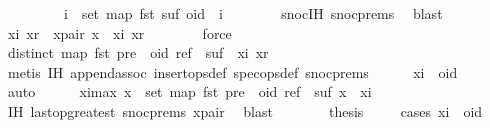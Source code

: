 \begin{isabellebody}
\ \ \ \ \ \ \ \ \ {\isacharparenleft}{\isasymforall}i\ {\isasymin}\ set\ {\isacharparenleft}map\ fst\ suf{\isacharparenright}{\isachardot}\ oid\ {\isacharless}\ i{\isacharparenright}{\isachardoublequoteclose}\isanewline
\ \ \ \ \ \ \isamarkupfalse%
\ snoc{\isachardot}IH\ snoc{\isachardot}prems{\isacharparenleft}{}{\isacharparenright}\ \isamarkupfalse%
\ blast\isanewline
\ \ \ \ \isamarkupfalse%
\ xi\ xr\ \ x{\isacharunderscore}pair{\isacharcolon}\ {\isachardoublequoteopen}x\ {\isacharequal}\ {\isacharparenleft}xi{\isacharcomma}\ xr{\isacharparenright}{\isachardoublequoteclose}\isanewline
\ \ \ \ \ \ \isamarkupfalse%
\ force\isanewline
\ \ \ \ \isamarkupfalse%
\ {\isachardoublequoteopen}distinct\ {\isacharparenleft}map\ fst\ {\isacharparenleft}pre\ {\isacharat}\ {\isacharbrackleft}{\isacharparenleft}oid{\isacharcomma}\ ref{\isacharparenright}{\isacharbrackright}\ {\isacharat}\ suf\ {\isacharat}\ {\isacharbrackleft}{\isacharparenleft}xi{\isacharcomma}\ xr{\isacharparenright}{\isacharbrackright}{\isacharparenright}{\isacharparenright}{\isachardoublequoteclose}\isanewline
\ \ \ \ \ \ \isamarkupfalse%
\ {\isacharparenleft}metis\ IH\ append{\isachardot}assoc\ insert{\isacharunderscore}ops{\isacharunderscore}def\ spec{\isacharunderscore}ops{\isacharunderscore}def\ snoc{\isachardot}prems{\isacharparenleft}{}{\isacharparenright}{\isacharparenright}\isanewline
\ \ \ \ \isamarkupfalse%
\ {\isachardoublequoteopen}xi\ {\isasymnoteq}\ oid{\isachardoublequoteclose}\isanewline
\ \ \ \ \ \ \isamarkupfalse%
\ auto\isanewline
\ \ \ \ \isamarkupfalse%
\ xi{\isacharunderscore}max{\isacharcolon}\ {\isachardoublequoteopen}{\isasymforall}x\ {\isasymin}\ set\ {\isacharparenleft}map\ fst\ {\isacharparenleft}pre\ {\isacharat}\ {\isacharbrackleft}{\isacharparenleft}oid{\isacharcomma}\ ref{\isacharparenright}{\isacharbrackright}\ {\isacharat}\ suf{\isacharparenright}{\isacharparenright}{\isachardot}\ x\ {\isacharless}\ xi{\isachardoublequoteclose}\isanewline
\ \ \ \ \ \ \isamarkupfalse%
\ IH\ last{\isacharunderscore}op{\isacharunderscore}greatest\ snoc{\isachardot}prems{\isacharparenleft}{}{\isacharparenright}\ x{\isacharunderscore}pair\ \isamarkupfalse%
\ blast\isanewline
\ \ \ \ \isamarkupfalse%
\ \isamarkupfalse%
\ {\isacharquery}thesis\isanewline
\ \ \ \ \isamarkupfalse%
{\isacharparenleft}cases\ {\isachardoublequoteopen}xi\ {\isacharless}\ oid{\isachardoublequoteclose}{\isacharparenright}\isanewline

\end{isabellebody}
